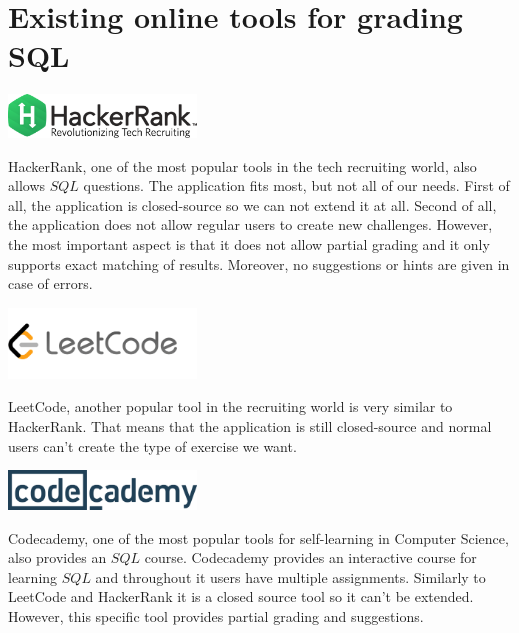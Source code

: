 \section{Existing online tools for grading SQL}

\begin{center}
    \includegraphics[width=50mm,scale=0.5]{images/HackerRank.png}
\end{center}

HackerRank, one of the most popular tools in the tech recruiting world, also allows $SQL$ questions. The application fits most, but not all of our needs. First of all, the application is closed-source so we can not extend it at all. Second of all, the application does not allow regular users to create new challenges. However, the most important aspect is that it does not allow partial grading and it only supports exact matching of results. Moreover, no suggestions or hints are given in case of errors.

\begin{center}
    \includegraphics[width=50mm,scale=0.5]{images/LeetCode.png}
\end{center}

LeetCode, another popular tool in the recruiting world is very similar to HackerRank. That means that the application is still closed-source and normal users can't create the type of exercise we want.


\begin{center}
    \includegraphics[width=50mm,scale=0.5]{images/CodeCademy.png}
\end{center}

Codecademy, one of the most popular tools for self-learning in Computer Science, also provides an $SQL$ course. Codecademy provides an interactive course for learning $SQL$ and throughout it users have multiple assignments. Similarly to LeetCode and HackerRank it is a closed source tool so it can't be extended. However, this specific tool provides partial grading and suggestions.

